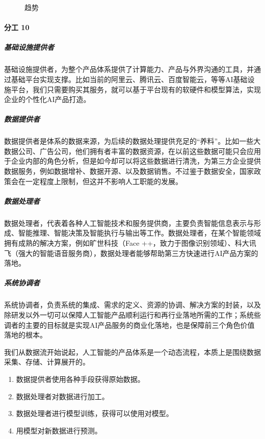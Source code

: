 \documentclass[letterpaper,10pt,english]{sphinxmanual}
\begin{document}
\begin{figure}[H]
\centering
\capstart

\noindent{}
\caption{趋势}\label{\detokenize{chapter_project/AI_industry_analysis:id30}}\end{figure}


\paragraph{分工 10\sphinxfootnotemark[719]}
\label{\detokenize{chapter_project/AI_industry_analysis:id10}}%
\begin{footnotetext}[719]\sphinxAtStartFootnote
{}
%
\end{footnotetext}\ignorespaces 

\subparagraph{基础设施提供者}
\label{\detokenize{chapter_project/AI_industry_analysis:id11}}
基础设施提供者，为整个产品体系提供了计算能力、产品与外界沟通的工具，并通过基础平台实现支撑。比如当前的阿里云、腾讯云、百度智能云，等等AI基础设施平台，我们只需要购买其服务，就可以基于平台现有的软硬件和模型算法，实现企业的个性化AI产品打造。


\subparagraph{数据提供者}
\label{\detokenize{chapter_project/AI_industry_analysis:id12}}
数据提供者是体系的数据来源，为后续的数据处理提供充足的“养料”。比如一些大数据公司、广告公司，他们拥有者丰富的数据资源，在以前这些数据可能只会应用于企业内部的角色分析，但是如今却可以将这些数据进行清洗，为第三方企业提供数据服务，例如数据增补、数据开源、以及数据销售。不过鉴于数据安全，国家政策会在一定程度上限制，但这并不影响人工职能的发展。


\subparagraph{数据处理者}
\label{\detokenize{chapter_project/AI_industry_analysis:id13}}
数据处理者，代表着各种人工智能技术和服务提供商，主要负责智能信息表示与形成、智能推理、智能决策及智能执行与输出等工作。数据处理者，在某个智能领域拥有成熟的解决方案，例如旷世科技（Face
++，致力于图像识别领域）、科大讯飞（强大的智能语音服务商），数据处理者能够帮助第三方快速进行AI产品方案的落地。


\subparagraph{系统协调者}
\label{\detokenize{chapter_project/AI_industry_analysis:id14}}
系统协调者，负责系统的集成、需求的定义、资源的协调、解决方案的封装，以及除研发以外一切可以保障人工智能产品顺利运行和再行业落地所需的工作；系统些调者的主要的目标就是实现AI产品服务的商业化落地，也是保障前三个角色价值落地的根本。

我们从数据流开始说起，人工智能的产品体系是一个动态流程，本质上是围绕数据采集、存储、计算展开的。
\begin{enumerate}
%
\item {} 
数据提供者使用各种手段获得原始数据。

\item {} 
数据处理者对数据进行加工。

\item {} 
数据处理者进行模型训练，获得可以使用对模型。

\item {} 
用模型对新数据进行预测。

\end{enumerate}
\end{document}
